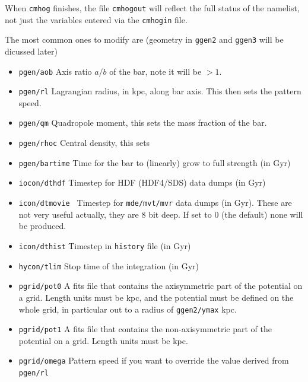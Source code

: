 \documentclass[10pt,dvips]{article}
\begin{document}
When {\tt cmhog} finishes, the file {\tt cmhogout} will reflect the full
status of the namelist, not just the variables entered via the {\tt cmhogin}
file. 

The most common ones to modify are (geometry in {\tt ggen2} and {\tt ggen3}
will be dicussed later)

\begin{itemize}

\item
{\tt pgen/aob}
Axis ratio $a/b$ of the bar, note it will be $> 1$.

\item
{\tt pgen/rl}
Lagrangian radius, in kpc, along bar axis. This then sets the pattern speed.

\item
{\tt pgen/qm}
Quadropole moment, this sets the mass fraction of the bar.

\item
{\tt pgen/rhoc}
Central density, this sets 

\item
{\tt pgen/bartime}
Time for the bar to (linearly) grow to full strength (in Gyr)

\item
{\tt iocon/dthdf}
Timestep for HDF (HDF4/SDS) data dumps (in Gyr)

\item
{\tt icon/dtmovie }
Timestep for {\tt mde/mvt/mvr} data dumps (in Gyr). These are
not very useful actually, they are 8 bit deep. If set to 0
(the default) none will be produced.

\item
{\tt icon/dthist}
Timestep in {\tt history} file (in Gyr)

\item
{\tt hycon/tlim}
Stop time of the integration (in Gyr)


\item
{\tt pgrid/pot0}
A fits file that contains the axisymmetric part of the potential
on a grid.
Length units must be kpc, and the potential must be defined
on the whole grid, in particular out
to a radius of {\tt ggen2/ymax} kpc.

\item
{\tt pgrid/pot1}
A fits file that contains the non-axisymmetric part of the potential
on a grid.
Length units must be kpc.

\item
{\tt pgrid/omega}
Pattern speed if you want to override the value derived from {\tt pgen/rl}


\end{itemize}
\end{document}
